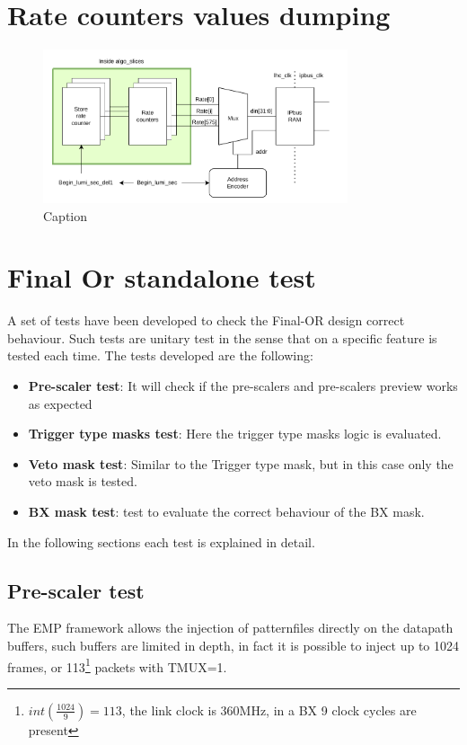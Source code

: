 \documentclass[a4paper,11pt]{article}
\begin{document}
\section{Rate counters values dumping}
\begin{figure}
    \centering
    \includegraphics[width=0.8\textwidth]{Images/Prescale-section/Rate_cnt_read.pdf}
    \caption{Caption}
    \label{fig:my_label}
\end{figure}


\section{Final Or standalone test}
A set of tests have been developed to check the Final-OR design correct behaviour. Such tests are unitary test in the sense that on a specific feature is tested each time. The tests developed are the following:
\begin{itemize}
    \item \textbf{Pre-scaler test}: It will check if the pre-scalers and pre-scalers preview works as expected
    \item \textbf{Trigger type masks test}: Here the trigger type masks logic is evaluated.
    \item \textbf{Veto mask test}: Similar to the Trigger type mask, but in this case only the veto mask is tested.
    \item \textbf{BX mask test}: test to evaluate the correct behaviour of the BX mask.
\end{itemize}
In the following sections each test is explained in detail.

\subsection{Pre-scaler test}
The EMP framework allows the injection of patternfiles directly on the datapath buffers, such buffers are limited in depth, in fact it is possible to inject up to 1024 frames, or 113\footnote{$int(\frac{1024}{9})=113$, the link clock is 360MHz, in a BX 9 clock cycles are present} packets with TMUX=1.  
\end{document}
